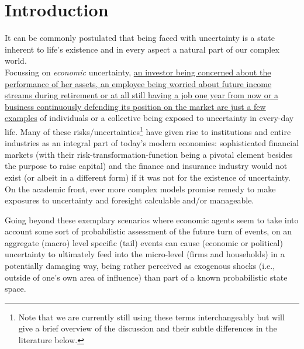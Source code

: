 \documentclass[a4paper,11pt,listof=nochaptergap,oneside,pointednumbers,bibtotoc,bigheadings,liststotoc]{scrbook}
\theoremstyle{mysatz}
\theoremstyle{mydefinition}
\theoremstyle{mytheorem}
\theoremstyle{mybemerkung}
\begin{document}
\chapter{Introduction}
It can be commonly postulated that being faced with uncertainty is a state inherent to life's existence and in every aspect a natural part of our complex world. \\
Focussing on \textit{economic} uncertainty, \href{http://citeseerx.ist.psu.edu/viewdoc/download?doi=10.1.1.334.4248&rep=rep1&type=pdf}{an investor being concerned about the performance of her assets, an employee being worried about future income streams during retirement or at all still having a job one year from now or a business continuously defending its position on the market are just a few examples} of individuals or a collective being exposed to uncertainty in every-day life. Many of these risks/uncertainties\footnote{Note that we are currently still using these terms interchangeably but will give a brief overview of the discussion and their subtle differences in the literature below.} have given rise to institutions and entire industries as an integral part of today's modern economies: sophisticated financial markets (with their risk-transformation-function being a pivotal element besides the purpose to raise capital) and the finance and insurance industry would not exist (or albeit in a different form) if it was not for the existence of uncertainty. On the academic front, ever more complex models promise remedy to make exposures to uncertainty and foresight calculable and/or manageable.

Going beyond these exemplary scenarios where economic agents seem to take into account some sort of probabilistic assessment of the future turn of events, on an aggregate (macro) level specific (tail) events can cause (economic or political) uncertainty to ultimately feed into the micro-level (firms and households) in a potentially damaging way, being rather perceived as exogenous shocks (i.e., outside of one's own area of influence) than part of a known probabilistic state space.
\end{document}
